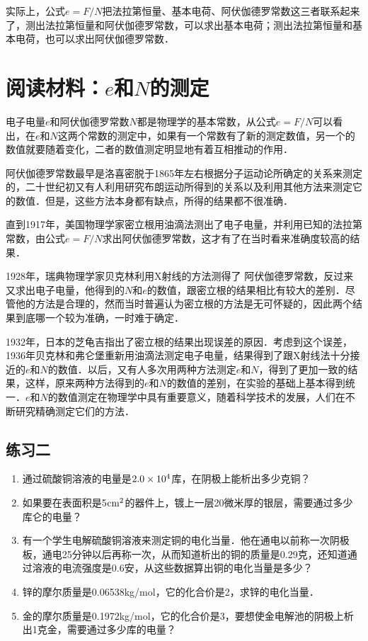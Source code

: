 实际上，公式$e=F/N$把法拉第恒量、基本电荷、阿伏伽德罗常数这三者联系起来了，测出法拉第恒量和阿伏伽德罗常数，可以求出基本电荷；测出法拉第恒量和基本电荷，也可以求出阿伏伽德罗常数．

\section*{阅读材料：$e$和$N$的测定}
电子电量$e$和阿伏伽德罗常数$N$都是物理学的基本常数，从公式$e=F/N$可以看出，在$e$和$N$这两个常数的测定中，如果有一个常数有了新的测定数值，另一个的数值就要随着变化，二者的数值测定明显地有着互相推动的作用．

阿伏伽德罗常数最早是洛喜密脱于1865年左右根据分子运动论所确定的关系来测定的，二十世纪初又有人利用研究布朗运动所得到的关系以及利用其他方法来测定它的数值．但是，这些方法本身都有缺点，所得的结果都不很准确．

直到1917年，美国物理学家密立根用油滴法测出了电子电量，并利用已知的法拉第常数，由公式$e=F/N$求出阿伏伽德罗常数，这才有了在当时看来准确度较高的结果．

1928年，瑞典物理学家贝克林利用X射线的方法测得了
阿伏伽德罗常数，反过来又求出电子电量，他得到的$N$和$e$的数值，跟密立根的结果相比有较大的差别．尽管他的方法是合理的，然而当时普遍认为密立根的方法是无可怀疑的，因此两个结果到底哪一个较为准确，一时难于确定．

1932年，日本的芝龟吉指出了密立根的结果出现误差的原因．考虑到这个误差，1936年贝克林和弗仑堡重新用油滴法测定电子电量，结果得到了跟X射线法十分接近的$e$和$N$的数值．以后，又有人多次用两种方法测定$e$和$N$，得到了更加一致的结果，这样，原来两种方法得到的$e$和$N$的数值的差别，在实验的基础上基本得到统一．$e$和$N$的数值测定在物理学中具有重要意义，随着科学技术的发展，人们在不断研究精确测定它们的方法．

\subsection*{练习二}
\begin{enumerate}
    \item 通过硫酸铜溶液的电量是$2.0\times10^4$库，在阴极上能析出多少克铜？
    \item 如果要在表面积是5${\rm cm^2}$的器件上，镀上一层20微米厚的银层，需要通过多少库仑的电量？
    \item 有一个学生电解硫酸铜溶液来测定铜的电化当量．他在通电以前称一次阴极板，通电25分钟以后再称一次，从而知道析出的铜的质量是0.29克，还知道通过溶液的电流强度是0.6安，从这些数据算出铜的电化当量是多少？
    \item 锌的摩尔质量是0.06538kg/mol，它的化合价是2，求锌的电化当量．
    \item 金的摩尔质量是0.1972kg/mol，它的化合价是3，要想使金电解池的阴极上析出1克金，需要通过多少库的电量？
\end{enumerate}


